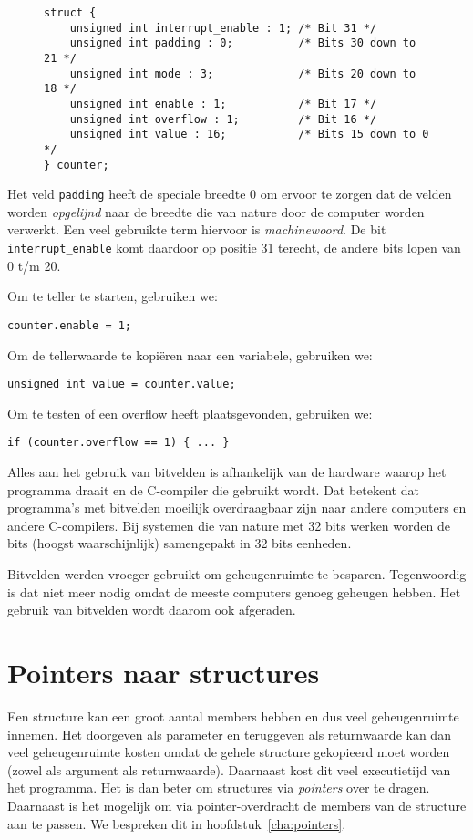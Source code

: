 \begin{figure}[!ht]
\begin{lstlisting}[caption=Voorbeeld van bitvelden.,label=cod:bitfields]
struct {
    unsigned int interrupt_enable : 1; /* Bit 31 */
    unsigned int padding : 0;          /* Bits 30 down to 21 */
    unsigned int mode : 3;             /* Bits 20 down to 18 */
    unsigned int enable : 1;           /* Bit 17 */
    unsigned int overflow : 1;         /* Bit 16 */
    unsigned int value : 16;           /* Bits 15 down to 0 */
} counter;
\end{lstlisting}
\end{figure}
Het veld \texttt{padding} heeft de speciale breedte 0 om ervoor te zorgen dat de velden worden \textsl{opgelijnd} naar de breedte die van nature door de computer worden verwerkt. Een veel gebruikte term hiervoor is \textsl{machinewoord}. De bit \texttt{interrupt\_enable} komt daardoor op positie 31 terecht, de andere bits lopen van 0 t/m 20.


Om te teller te starten, gebruiken we:

\hspace*{1em}\texttt{counter.enable = 1;}

Om de tellerwaarde te kopiëren naar een variabele, gebruiken we:

\hspace*{1em}\texttt{unsigned int value = counter.value;}

Om te testen of een overflow heeft plaatsgevonden, gebruiken we:

\hspace*{1em}\texttt{if (counter.overflow == 1) \{ ... \} }

Alles aan het gebruik van bitvelden is afhankelijk van de hardware waarop het programma draait en de C-compiler die gebruikt wordt. Dat betekent dat programma's met bitvelden moeilijk overdraagbaar zijn naar andere computers en andere C-compilers. Bij systemen die van nature met 32 bits werken worden de bits (hoogst waarschijnlijk) samengepakt in 32 bits eenheden.

Bitvelden werden vroeger gebruikt om geheugenruimte te besparen. Tegenwoordig is dat niet meer nodig omdat de meeste computers genoeg geheugen hebben. Het gebruik van bitvelden wordt daarom ook afgeraden.

\section{Pointers naar structures}
Een structure kan een groot aantal members hebben en dus veel geheugenruimte innemen. Het doorgeven als parameter en teruggeven als returnwaarde kan dan veel geheugenruimte kosten omdat de gehele structure gekopieerd moet worden (zowel als argument als returnwaarde). Daarnaast kost dit veel executietijd van het programma. Het is dan beter om structures via \textsl{pointers} over te dragen. Daarnaast is het mogelijk om via pointer-overdracht de members van de structure aan te passen. We bespreken dit in hoofdstuk~\ref{cha:pointers}.
	
\basic
